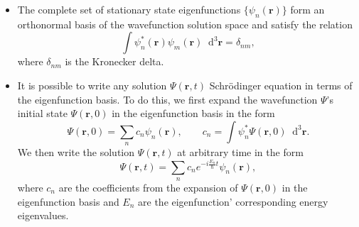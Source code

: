 \documentclass[11pt, a4paper]{article}
\newcommand{\diff}{\mathop{}\!\mathrm{d}} %
\newcommand{\dr}{\diff^{3} \r}  %
\newcommand{\Schro}{Schr\"{o}dinger\xspace}
\renewcommand{\vec}[1]{\bm{#1}} %
\renewcommand{\r}{\vec{r}}  %
\newcommand{\p}{\psi}  %
\renewcommand{\P}{\Psi}  %
\begin{document}
\begin{itemize}
	\item The complete set of stationary state eigenfunctions $ \{\p_{n}(\r)\} $ form an orthonormal basis of the wavefunction solution space and satisfy the relation
	\begin{equation*}
		\int \p^{*}_{n}(\r)  \p_{m}(\r) \dr = \delta_{nm},
	\end{equation*}
	where $ \delta_{nm} $ is the Kronecker delta. 
	
	\item It is possible to write any solution $ \P(\r, t) $ \Schro equation in terms of the eigenfunction basis. To do this, we first expand the wavefunction $ \P $'s initial state $ \P(\r, 0) $ in the eigenfunction basis in the form
	\begin{equation*}
		\P(\r, 0) = \sum_{n}c_{n} \p_{n}(\r), \qquad c_{n} = \int \p_{n}^{*}\P(\r, 0)\dr.
	\end{equation*}
	We then write the solution $ \P(\r, t) $ at arbitrary time in the form
	\begin{equation*}
		\P(\r, t) = \sum_{n}c_{n}e^{-i\frac{E_{n}}{\hbar}t}\p_{n}(\r),
	\end{equation*}
	where $ c_{n} $ are the coefficients from the expansion of $ \P(\r, 0) $ in the eigenfunction basis and $ E_{n} $ are the eigenfunction' corresponding energy eigenvalues.
\end{itemize}
\end{document}

